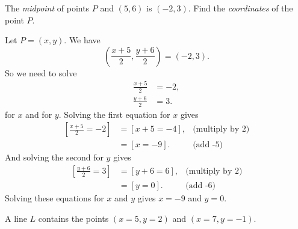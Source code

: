 \documentclass[12pt,fleqn,answers]{exam}
\begin{document}
\begin{questions}
\begin{solution}[2.0in]
    
    
    \end{solution}
    
    \question[5] The \emph{midpoint} of points $P$ and $(5,6)$ is $(-2,3)$. Find the 
    \emph{coordinates} of the point $P$.
    \begin{solution}[2.0in] Let $P = (x,y)$. We have
        \begin{equation*}
            \left(\frac{x+5}{2}, \frac{y+6}{2} \right) = (-2,3).
        \end{equation*}
        So we need to solve
        \begin{align*}
            \frac{x+5}{2} &= -2,\\
            \frac{y+6}{2} &= 3.
        \end{align*}
        for $x$ and for $y$. Solving the first equation for $x$ gives
        \begin{align*}
            \left[  \frac{x+5}{2} = -2 \right] &= [x + 5 = -4], &\mbox{(multiply by 2)}\\
                                                &= [x=-9]. &\mbox{(add -5)}
        \end{align*}
        And solving the second for $y$ gives
        \begin{align*}
            \left[  \frac{y+6}{2} = 3 \right] &= [y+6 = 6], &\mbox{(multiply by 2)}\\
                                               &= [y=0]. &\mbox{(add -6)}
        \end{align*}
        Solving these equations for $x$ and $y$ gives $x=-9$ and $y=0$.
    
    \end{solution}
    \question A line $L$ contains the points $(x=5,y=2)$ and
    $(x=7,y=-1)$.  
    
\end{questions}
\end{document}
